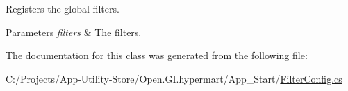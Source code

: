 Registers the global filters. 


\begin{DoxyParams}{Parameters}
{\em filters} & The filters.\\
\hline
\end{DoxyParams}


The documentation for this class was generated from the following file\+:\begin{DoxyCompactItemize}
\item 
C\+:/\+Projects/\+App-\/\+Utility-\/\+Store/\+Open.\+G\+I.\+hypermart/\+App\+\_\+\+Start/\hyperlink{_filter_config_8cs}{Filter\+Config.\+cs}\end{DoxyCompactItemize}
